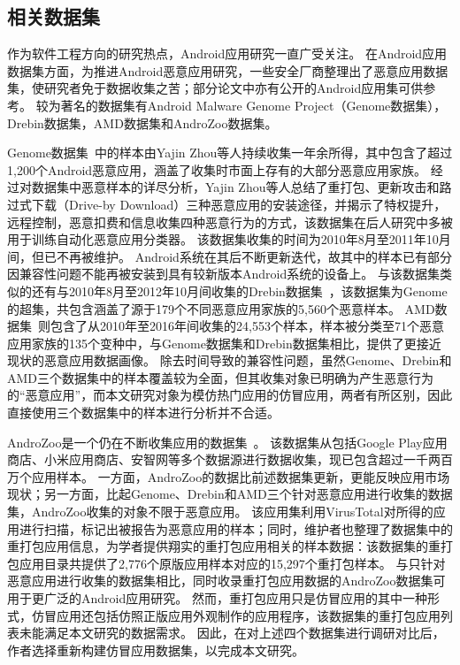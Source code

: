 \subsection{相关数据集}

作为软件工程方向的研究热点，Android应用研究一直广受关注。
在Android应用数据集方面，为推进Android恶意应用研究，一些安全厂商整理出了恶意应用数据集，使研究者免于数据收集之苦；部分论文中亦有公开的Android应用集可供参考。
较为著名的数据集有Android Malware Genome Project（Genome数据集），Drebin数据集，AMD数据集和AndroZoo数据集。

Genome数据集~\cite{Zhou2012DissectingAM}中的样本由Yajin Zhou等人持续收集一年余所得，其中包含了超过1,200个Android恶意应用，涵盖了收集时市面上存有的大部分恶意应用家族。
经过对数据集中恶意样本的详尽分析，Yajin Zhou等人总结了重打包、更新攻击和路过式下载（Drive-by Download）三种恶意应用的安装途径，并揭示了特权提升，远程控制，恶意扣费和信息收集四种恶意行为的方式，该数据集在后人研究中多被用于训练自动化恶意应用分类器。
该数据集收集的时间为2010年8月至2011年10月间，但已不再被维护。
Android系统在其后不断更新迭代，故其中的样本已有部分因兼容性问题不能再被安装到具有较新版本Android系统的设备上。
与该数据集类似的还有与2010年8月至2012年10月间收集的Drebin数据集~\cite{arp2014drebin}，该数据集为Genome的超集，共包含涵盖了源于179个不同恶意应用家族的5,560个恶意样本。
AMD数据集~\cite{li2017android}则包含了从2010年至2016年间收集的24,553个样本，样本被分类至71个恶意应用家族的135个变种中，与Genome数据集和Drebin数据集相比，提供了更接近现状的恶意应用数据画像。
除去时间导致的兼容性问题，虽然Genome、Drebin和AMD三个数据集中的样本覆盖较为全面，但其收集对象已明确为产生恶意行为的``恶意应用''，而本文研究对象为模仿热门应用的仿冒应用，两者有所区别，因此直接使用三个数据集中的样本进行分析并不合适。

AndroZoo是一个仍在不断收集应用的数据集~\cite{li2017androzoo++}。
该数据集从包括Google Play应用商店、小米应用商店、安智网等多个数据源进行数据收集，现已包含超过一千两百万个应用样本。
一方面，AndroZoo的数据比前述数据集更新，更能反映应用市场现状；另一方面，比起Genome、Drebin和AMD三个针对恶意应用进行收集的数据集，AndroZoo收集的对象不限于恶意应用。
该应用集利用VirusTotal对所得的应用进行扫描，标记出被报告为恶意应用的样本；同时，维护者也整理了数据集中的重打包应用信息，为学者提供翔实的重打包应用相关的样本数据：该数据集的重打包应用目录共提供了2,776个原版应用样本对应的15,297个重打包样本。
与只针对恶意应用进行收集的数据集相比，同时收录重打包应用数据的AndroZoo数据集可用于更广泛的Android应用研究。
然而，重打包应用只是仿冒应用的其中一种形式，仿冒应用还包括仿照正版应用外观制作的应用程序，该数据集的重打包应用列表未能满足本文研究的数据需求。
因此，在对上述四个数据集进行调研对比后，作者选择重新构建仿冒应用数据集，以完成本文研究。

